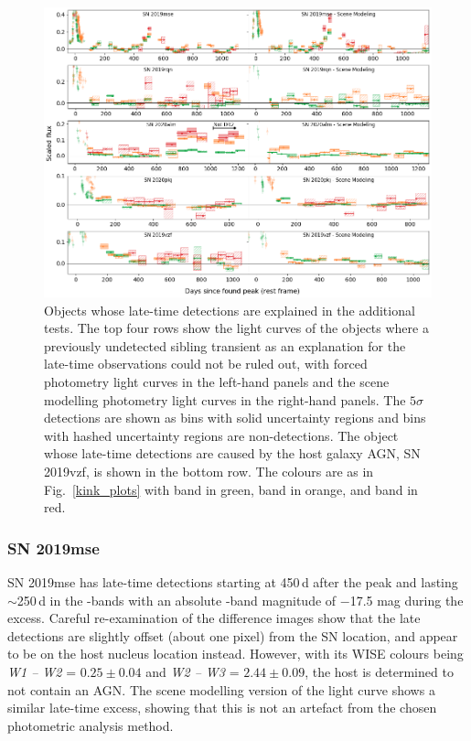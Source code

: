 \documentclass[a4paper,oneside,12pt, class=Latex/Classes/PhDthesisPSnPDF, crop=false]{standalone}
\begin{document}
\begin{figure}
 \centering
 \includegraphics[width=\textwidth]{../Images/chapter_3/other_alt_plots.png}
 \caption{Objects whose late-time detections are explained in the additional tests. The top four rows show the light curves of the objects where a previously undetected sibling transient as an explanation for the late-time observations could not be ruled out, with forced photometry light curves in the left-hand panels and the scene modelling photometry light curves in the right-hand panels. The $5\sigma$ detections are shown as bins with solid uncertainty regions and bins with hashed uncertainty regions are non-detections. The object whose late-time detections are caused by the host galaxy AGN, SN 2019vzf, is shown in the bottom row. The colours are as in Fig.~\ref{kink_plots} with \ztfg band in green, \ztfr band in orange, and \ztfi band in red.}
 \label{other_alt}
\end{figure}

\subsubsection*{SN 2019mse}
SN 2019mse has late-time detections starting at 450\,d after the peak and lasting $\sim$250\,d in the \ztfg\ztfr\ztfi-bands with an absolute \ztfr-band magnitude of $-$17.5 mag during the excess. Careful re-examination of the difference images show that the late detections are slightly offset (about one pixel) from the SN location, and appear to be on the host nucleus location instead. However, with its WISE colours being \textit{W1 -- W2} = $0.25\pm0.04$ and \textit{W2 -- W3} = $2.44\pm0.09$, the host is determined to not contain an AGN. The scene modelling version of the light curve shows a similar late-time excess, showing that this is not an artefact from the chosen photometric analysis method. 
\end{document}
